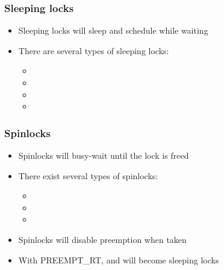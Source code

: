 \begin{frame}
  \frametitle{Sleeping locks}
        \begin{itemize}
                \item Sleeping locks will sleep and schedule while waiting
                \item There are several types of sleeping locks:
        \begin{itemize}
                \item {}
                \item {}
                \item {}
                \item {}
        \end{itemize}
        \end{itemize}
\end{frame}

\begin{frame}
  \frametitle{Spinlocks}
        \begin{itemize}
                \item Spinlocks will busy-wait until the lock is freed
                \item There exist several types of spinlocks:
                \begin{itemize}
                        \item {}
                        \item {}
                        \item {}
                \end{itemize}
                \item Spinlocks will disable preemption when taken
                \item With PREEMPT\_RT,  and  will become sleeping locks
        \end{itemize}
\end{frame}

